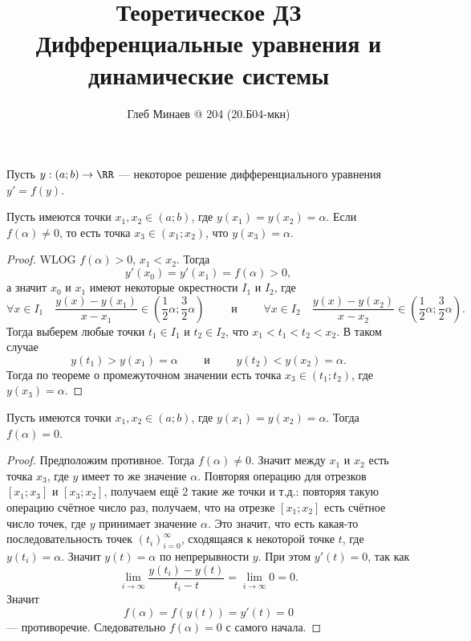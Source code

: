 \documentclass[12pt,a4paper]{article}
\title{Теоретическое ДЗ\\Дифференциальные уравнения и динамические системы}
\author{Глеб Минаев @ 204 (20.Б04-мкн)}
\begin{document}
    \maketitle
    
    \begin{problem*}[№1]
        Пусть $y: (a; b) \to \RR$ --- некоторое решение дифференциального уравнения $y' = f(y)$.

        \begin{lemma}
            Пусть имеются точки $x_1, x_2 \in (a; b)$, где $y(x_1) = y(x_2) = \alpha$. Если $f(\alpha) \neq 0$, то есть точка $x_3 \in (x_1; x_2)$, что $y(x_3) = \alpha$. 
        \end{lemma}

        \begin{proof}
            WLOG $f(\alpha) > 0$, $x_1 < x_2$. Тогда
            \[y'(x_0) = y'(x_1) = f(\alpha) > 0,\]
            а значит $x_0$ и $x_1$ имеют некоторые окрестности $I_1$ и $I_2$, где
            \[
                \forall x \in I_1 \quad \frac{y(x) - y(x_1)}{x - x_1} \in (\frac{1}{2} \alpha; \frac{3}{2} \alpha)
                \qquad \text{ и } \qquad
                \forall x \in I_2 \quad \frac{y(x) - y(x_2)}{x - x_2} \in (\frac{1}{2} \alpha; \frac{3}{2} \alpha).
            \]
            Тогда выберем любые точки $t_1 \in I_1$ и $t_2 \in I_2$, что $x_1 < t_1 < t_2 < x_2$. В таком случае
            \[y(t_1) > y(x_1) = \alpha \qquad \text{ и } \qquad y(t_2) < y(x_2) = \alpha.\]
            Тогда по теореме о промежуточном значении есть точка $x_3 \in (t_1; t_2)$, где $y(x_3) = \alpha$.
        \end{proof}

        \begin{lemma}
            Пусть имеются точки $x_1, x_2 \in (a; b)$, где $y(x_1) = y(x_2) = \alpha$. Тогда $f(\alpha) = 0$.
        \end{lemma}
        

        \begin{proof}
            Предположим противное. Тогда $f(\alpha) \neq 0$. Значит между $x_1$ и $x_2$ есть точка $x_3$, где $y$ имеет то же значение $\alpha$. Повторяя операцию для отрезков $[x_1; x_3]$ и $[x_3; x_2]$, получаем ещё 2 такие же точки и т.д.: повторяя такую операцию счётное число раз, получаем, что на отрезке $[x_1; x_2]$ есть счётное число точек, где $y$ принимает значение $\alpha$. Это значит, что есть какая-то последовательность точек $(t_i)_{i=0}^\infty$, сходящаяся к некоторой точке $t$, где $y(t_i) = \alpha$. Значит $y(t) = \alpha$ по непрерывности $y$. При этом $y'(t) = 0$, так как
            \[\lim_{i \to \infty} \frac{y(t_i) - y(t)}{t_i - t} = \lim_{i \to \infty} 0 = 0.\]
            Значит
            \[f(\alpha) = f(y(t)) = y'(t) = 0\]
            --- противоречие. Следовательно $f(\alpha) = 0$ с самого начала.
        \end{proof}


\end{problem*}
\end{document}
